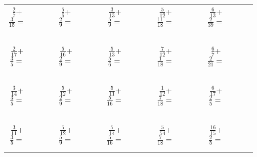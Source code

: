\documentclass[12pt]{article}
\begin{document}


\begin{table}[H]
\centering
\large
\begin{tabular}{ccccc  ccccc  ccccc ccccc}
$\frac{2}{7}$+$\frac{3}{15}=$&&&&$\frac{5}{6}$+$\frac{2}{9}=$&&&&$\frac{3}{13}$+$\frac{5}{9}=$&&&&$\frac{5}{12}$+$\frac{11}{18}=$&&&&$\frac{6}{13}$+$\frac{2}{39}=$&&&\\
&&&&&&&&&&&&&&&&&&\\
&&&&&&&&&&&&&&&&&&\\
&&&&&&&&&&&&&&&&&&\\
&&&&&&&&&&&&&&&&&&\\
&&&&&&&&&&&&&&&&&&\\
$\frac{2}{17}$+$\frac{3}{5}=$&&&&$\frac{5}{16}$+$\frac{2}{9}=$&&&&$\frac{5}{13}$+$\frac{5}{6}=$&&&&$\frac{7}{12}$+$\frac{1}{18}=$&&&&$\frac{6}{7}$+$\frac{2}{21}=$&&&\\
&&&&&&&&&&&&&&&&&&\\
&&&&&&&&&&&&&&&&&&\\
&&&&&&&&&&&&&&&&&&\\
&&&&&&&&&&&&&&&&&&\\
&&&&&&&&&&&&&&&&&&\\
$\frac{3}{14}$+$\frac{3}{5}=$&&&&$\frac{5}{12}$+$\frac{2}{9}=$&&&&$\frac{5}{11}$+$\frac{5}{16}=$&&&&$\frac{1}{12}$+$\frac{7}{18}=$&&&&$\frac{6}{17}$+$\frac{2}{5}=$&&&\\
&&&&&&&&&&&&&&&&&&\\
&&&&&&&&&&&&&&&&&&\\
&&&&&&&&&&&&&&&&&&\\
&&&&&&&&&&&&&&&&&&\\
&&&&&&&&&&&&&&&&&&\\
$\frac{3}{11}$+$\frac{3}{5}=$&&&&$\frac{5}{12}$+$\frac{5}{9}=$&&&&$\frac{5}{14}$+$\frac{5}{16}=$&&&&$\frac{5}{54}$+$\frac{7}{18}=$&&&&$\frac{16}{15}$+$\frac{2}{5}=$&&&\\
&&&&&&&&&&&&&&&&&&\\
&&&&&&&&&&&&&&&&&&\\

\end{tabular}
\end{table}
\end{document}
